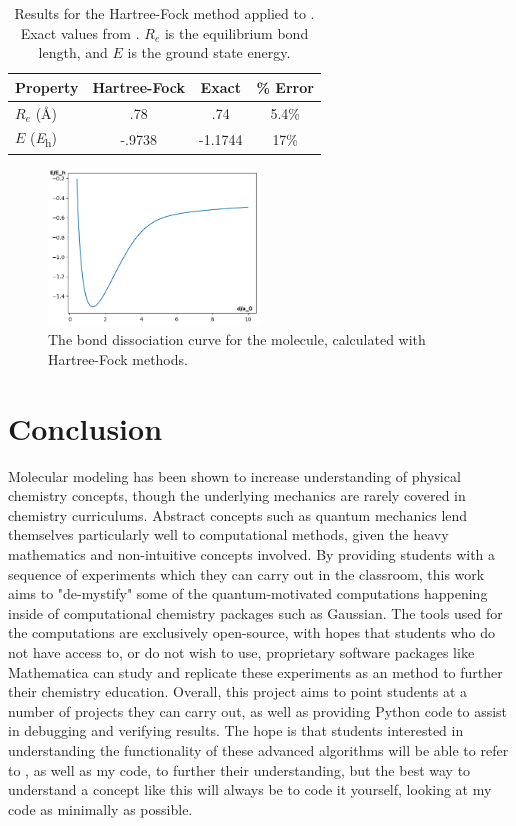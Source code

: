 \documentclass[journal=jacsat,manuscript=communication]{achemso}
\begin{document}
{{\setlength{\extrarowheight}{2pt}
\begin{table}[H]
  \begin{tabular}{l|ccc}
    Property & Hartree-Fock & Exact & \% Error \\
    \hline
    $R_e$ (\si{\angstrom}) & .78 & .74 & 5.4\%\\
    $E$ (\si{\hartree}) & -.9738 & -1.1744 & 17\%
  \end{tabular}
  \caption{Results for the Hartree-Fock method applied to .  Exact values from \citet{schrierIntroductionComputationalPhysical2017}.  $R_e$ is the equilibrium bond length, and $E$ is the ground state energy. }
  \label{tab:hf}
\end{table}

\begin{figure}[H]
  \includegraphics[width=0.5\textwidth]{figures/Bond_Dissociation_Hydrogen.png}
  \caption{The bond dissociation curve for the  molecule, calculated with Hartree-Fock methods.}
  \label{fig:hf_bd}
\end{figure}

\section{Conclusion}
Molecular modeling has been shown to increase understanding of physical chemistry concepts\cite{ealyStudentsUnderstandingEnhanced2004}, though the underlying mechanics are rarely covered in chemistry curriculums.  Abstract concepts such as quantum mechanics lend themselves particularly well to computational methods, given the heavy mathematics and non-intuitive concepts involved.  By providing students with a sequence of experiments which they can carry out in the classroom, this work aims to "de-mystify" some of the quantum-motivated computations happening inside of computational chemistry packages such as Gaussian. The tools used for the computations are exclusively open-source, with hopes that students who do not have access to, or do not wish to use, proprietary software packages like Mathematica can study and replicate these experiments as an method to further their chemistry education. Overall, this project aims to point students at a number of projects they can carry out, as well as providing Python code to assist in debugging and verifying results. The hope is that students interested in understanding the functionality of these advanced algorithms will be able to refer to \citet{schrierIntroductionComputationalPhysical2017}, \citet{morgensternUnderstandingQuantumMechanical2023} as well as my code, to further their understanding, but the best way to understand a concept like this will always be to code it yourself, looking at my code as minimally as possible. 

}}
\end{document}
